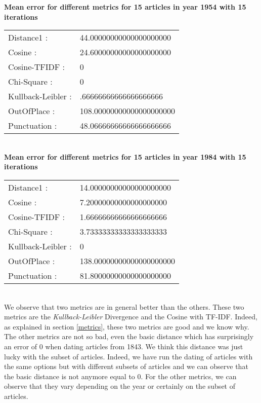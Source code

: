\textbf{Mean error for different metrics for 15 articles in year 1954 with 15 iterations}\\
\begin{tabular}{p{3cm} p{5cm}}
    Distance1 :& 44.00000000000000000000\\
    Cosine :& 24.60000000000000000000\\
    Cosine-TFIDF :& 0\\
    Chi-Square :& 0\\
    Kullback-Leibler :& .66666666666666666666\\
    OutOfPlace :& 108.00000000000000000000\\
    Punctuation :& 48.06666666666666666666\\
\end{tabular}\\
 
\textbf{Mean error for different metrics for 15 articles in year 1984 with 15 iterations}\\
\begin{tabular}{p{3cm} p{5cm}}
    Distance1 :& 14.00000000000000000000\\
    Cosine :& 7.20000000000000000000\\
    Cosine-TFIDF :& 1.66666666666666666666\\
    Chi-Square :& 3.73333333333333333333\\
    Kullback-Leibler :& 0\\
    OutOfPlace :& 138.00000000000000000000\\
    Punctuation :& 81.80000000000000000000\\
\end{tabular}\\

We observe that two metrics are in general better than the others. These two metrics are the \emph{Kullback-Leibler} Divergence and the Cosine with TF-IDF. Indeed, as explained in section \ref{metrics}, these two metrics are good and we know why. The other metrics are not so bad, even the basic distance which has surprisingly an error of 0 when dating articles from 1843. We think this distance was just lucky with the subset of articles. Indeed, we have run the dating of articles with the same options but with different subsets of articles and we can observe that the basic distance is not anymore equal to 0. For the other metrics, we can observe that they vary depending on the year or certainly on the subset of articles.\\

